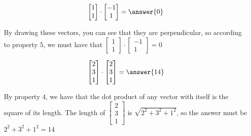 \documentclass{ximera}
\begin{document}
\begin{question}
	\[
	\begin{bmatrix} 1 \\ 1\end{bmatrix} \cdot \begin{bmatrix} -1 \\ 1\end{bmatrix} = \answer{0}
	\]
		\begin{hint}
			By drawing these vectors, you can see that they are perpendicular, so according to property $5$, we must have that $\begin{bmatrix} 1 \\ 1\end{bmatrix} \cdot \begin{bmatrix} -1 \\ 1\end{bmatrix} = 0$
		\end{hint}
\end{question}

\begin{question}
\[
\begin{bmatrix} 2 \\ 3 \\ 1\end{bmatrix} \cdot \begin{bmatrix} 2 \\ 3 \\1\end{bmatrix}= \answer{14} 
\]	

\begin{hint}
	By property $4$, we have that the dot product of any vector with itself is the square of its length.  The length of $\begin{bmatrix} 2 \\ 3 \\ 1\end{bmatrix}$ is $\sqrt{2^2+3^2+1^2}$, so the answer must be $2^2+3^2+1^2  =14$
\end{hint}
\end{question}
\end{document}
